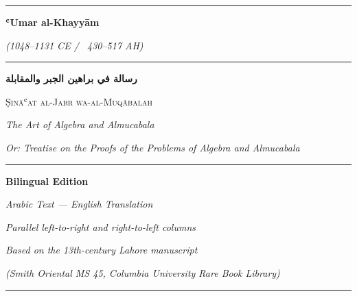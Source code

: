 \documentclass[11pt,a4paper]{book}
\begin{document}

\begin{titlepage}
\begin{center}
\vspace*{1.5cm}
{\color{titlecolor}\rule{\textwidth}{1.5pt}}

\vspace{1cm}
{\Huge\bfseries\color{titlecolor} ʿUmar al-Khayyām}

\vspace{0.5cm}
{\Large\itshape (1048–1131 CE / ~430–517 AH)}

\vspace{1.5cm}
{\color{titlecolor}\rule{0.7\textwidth}{0.8pt}}

\vspace{1.5cm}

\begin{Arabic}
{\arabicfont\Huge\bfseries رسالة في براهين الجبر والمقابلة}
\end{Arabic}

\vspace{0.8cm}
{\LARGE\scshape Ṣināʿat al-Jabr wa-al-Muqābalah}

\vspace{0.3cm}
{\large\textit{The Art of Algebra and Almucabala}}

\vspace{0.3cm}
{\normalsize\textit{Or: Treatise on the Proofs of the Problems of Algebra and Almucabala}}

\vspace{1.5cm}
{\color{titlecolor}\rule{0.7\textwidth}{0.8pt}}

\vspace{1cm}
{\Large\textbf{Bilingual Edition}}

\vspace{0.3cm}
{\large\textit{Arabic Text — English Translation}}

\vspace{0.5cm}
{\small\textit{Parallel left-to-right and right-to-left columns}}

\vspace{2cm}
{\small\textit{Based on the 13th-century Lahore manuscript}}

\vspace{0.2cm}
{\small\textit{(Smith Oriental MS 45, Columbia University Rare Book Library)}}

\vspace{1cm}
{\color{titlecolor}\rule{\textwidth}{1.5pt}}
\end{center}
\end{titlepage}
\end{document}
